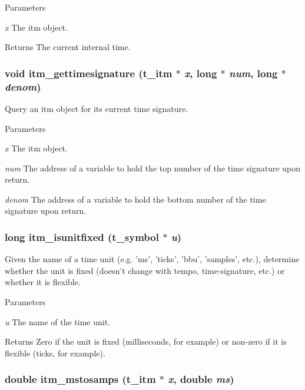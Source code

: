\begin{DoxyParams}{Parameters}
\item[{\em x}]The itm object. \end{DoxyParams}
\begin{DoxyReturn}{Returns}
The current internal time. 
\end{DoxyReturn}
\hypertarget{group__time_ga7ced567aa268c709daf2152503de8832}{
\subsubsection[{itm\_\-gettimesignature}]{\setlength{\rightskip}{0pt plus 5cm}void itm\_\-gettimesignature ({\bf t\_\-itm} $\ast$ {\em x}, \/  long $\ast$ {\em num}, \/  long $\ast$ {\em denom})}}
\label{group__time_ga7ced567aa268c709daf2152503de8832}


Query an itm object for its current time signature. 
\begin{DoxyParams}{Parameters}
\item[{\em x}]The itm object. \item[{\em num}]The address of a variable to hold the top number of the time signature upon return. \item[{\em denom}]The address of a variable to hold the bottom number of the time signature upon return. \end{DoxyParams}
\hypertarget{group__time_ga6950c5550d8beec9d1df56c96b3c9c88}{
\subsubsection[{itm\_\-isunitfixed}]{\setlength{\rightskip}{0pt plus 5cm}long itm\_\-isunitfixed ({\bf t\_\-symbol} $\ast$ {\em u})}}
\label{group__time_ga6950c5550d8beec9d1df56c96b3c9c88}


Given the name of a time unit (e.g. 'ms', 'ticks', 'bbu', 'samples', etc.), determine whether the unit is fixed (doesn't change with tempo, time-\/signature, etc.) or whether it is flexible.


\begin{DoxyParams}{Parameters}
\item[{\em u}]The name of the time unit. \end{DoxyParams}
\begin{DoxyReturn}{Returns}
Zero if the unit is fixed (milliseconds, for example) or non-\/zero if it is flexible (ticks, for example). 
\end{DoxyReturn}
\hypertarget{group__time_gaa131b77f55df783dda39c2a97c7af440}{
\subsubsection[{itm\_\-mstosamps}]{\setlength{\rightskip}{0pt plus 5cm}double itm\_\-mstosamps ({\bf t\_\-itm} $\ast$ {\em x}, \/  double {\em ms})}}
\label{group__time_gaa131b77f55df783dda39c2a97c7af440}


